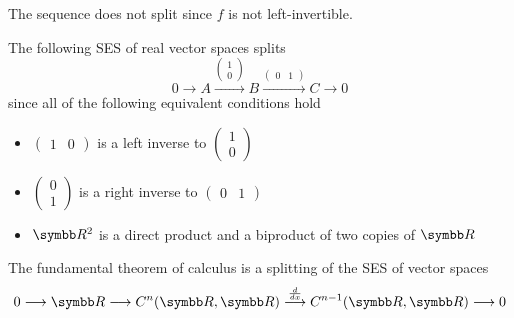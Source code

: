\begin{example}
\begin{defenum}
    The sequence does not split since \( f \) is not left-invertible.

     The following SES of real vector spaces splits
    \begin{equation*}
      0
      \longrightarrow
      A
      \overset {\left(\begin{smallmatrix}1 \\ 0\end{smallmatrix}\right)} \longrightarrow
      B
      \overset {\left(\begin{smallmatrix}0 & 1\end{smallmatrix}\right)} \longrightarrow
      C
      \longrightarrow
      0
    \end{equation*}
    since all of the following equivalent conditions hold
    \begin{itemize}
      \item \( \left(\begin{smallmatrix}1 & 0\end{smallmatrix}\right) \) is a left inverse to \( \left(\begin{smallmatrix}1 \\ 0\end{smallmatrix}\right) \)
      \item \( \left(\begin{smallmatrix}0 \\ 1\end{smallmatrix}\right) \) is a right inverse to \( \left(\begin{smallmatrix}0 & 1\end{smallmatrix}\right) \)
      \item \( \BR^2 \) is a direct product and a biproduct of two copies of \( \BR \)
    \end{itemize}

     The fundamental theorem of calculus is a splitting of the SES of vector spaces
    \begin{equation*}
      0
      \longrightarrow
      \BR
      \longrightarrow
      C^n(\BR, \BR)
      \overset {\frac d {dx}} \longrightarrow
      C^{n-1}(\BR, \BR)
      \longrightarrow
      0
    \end{equation*}
  \end{defenum}
\end{example}

